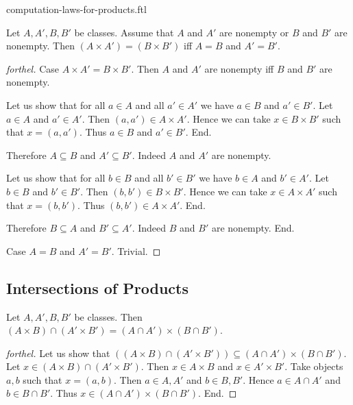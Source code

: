 \documentclass{naproche-library}
\begin{document}
\begin{smodule}{computation-laws-for-products.ftl}
  \begin{proposition}[forthel,id=FOUNDATIONS_05_2677218429894656]
    Let $A, A', B, B'$ be classes.
    Assume that $A$ and $A'$ are nonempty or $B$ and $B'$ are nonempty.
    Then $(A \times A') = (B \times B')$ iff $A = B$ and $A' = B'$.
  \end{proposition}
  \begin{proof}[forthel]
    Case $A \times A' = B \times B'$.
      Then $A$ and $A'$ are nonempty iff $B$ and $B'$ are nonempty.

      Let us show that for all $a \in A$ and all $a' \in A'$ we have $a \in B$ and $a' \in B'$.
        Let $a \in A$ and $a' \in A'$.
        Then $(a, a') \in A \times A'$.
        Hence we can take $x \in B \times B'$ such that $x = (a, a')$.
        Thus $a \in B$ and $a' \in B'$.
      End.

      Therefore $A \subseteq B$ and $A' \subseteq B'$.
      Indeed $A$ and $A'$ are nonempty.

      Let us show that for all $b \in B$ and all $b' \in B'$ we have $b \in A$ and $b' \in A'$.
        Let $b \in B$ and $b' \in B'$.
        Then $(b, b') \in B \times B'$.
        Hence we can take $x \in A \times A'$ such that $x = (b, b')$.
        Thus $(b, b') \in A \times A'$.
      End.

      Therefore $B \subseteq A$ and $B' \subseteq A'$.
      Indeed $B$ and $B'$ are nonempty.
    End.

    Case $A = B$ and $A' = B'$. Trivial.
  \end{proof}


  \subsection*{Intersections of Products}

  \begin{proposition}[forthel,id=FOUNDATIONS_05_4154592050806784]
    Let $A, A', B, B'$ be classes.
    Then $(A \times B) \cap (A' \times B') = (A \cap A') \times (B \cap B')$.
  \end{proposition}
  \begin{proof}[forthel]
    Let us show that $((A \times B) \cap (A' \times B')) \subseteq (A \cap A') \times (B \cap B')$. %
      Let $x \in (A \times B) \cap (A' \times B')$.
      Then $x \in A \times B$ and $x \in A' \times B'$.
      Take objects $a, b$ such that $x = (a, b)$.
      Then $a \in A, A'$ and $b \in B, B'$.
      Hence $a \in A \cap A'$ and $b \in B \cap B'$.
      Thus $x \in (A \cap A') \times (B \cap B')$.
    End.


\end{proof}
\end{smodule}
\end{document}
